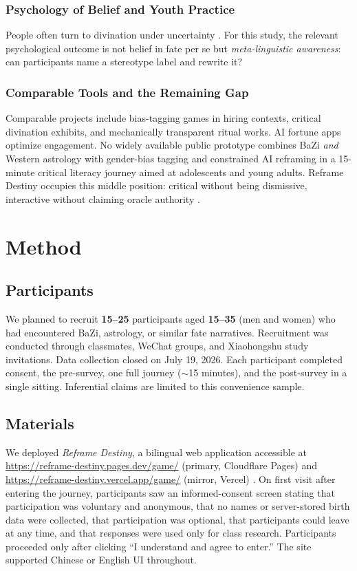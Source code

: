 \documentclass[stu,12pt,floatsintext]{apa7}
\begin{document}
\subsubsection{Psychology of Belief and Youth Practice}

People often turn to divination under uncertainty \parencite{vyse2018}. For this study, the relevant psychological outcome is not belief in fate per se but \emph{meta-linguistic awareness}: can participants name a stereotype label and rewrite it?

\subsubsection{Comparable Tools and the Remaining Gap}

Comparable projects include bias-tagging games in hiring contexts, critical divination exhibits, and mechanically transparent ritual works. AI fortune apps optimize engagement. No widely available public prototype combines BaZi \emph{and} Western astrology with gender-bias tagging and constrained AI reframing in a 15-minute critical literacy journey aimed at adolescents and young adults. Reframe Destiny occupies this middle position: critical without being dismissive, interactive without claiming oracle authority \parencite{bender2021}.

\section{Method}

\subsection{Participants}

We planned to recruit \textbf{15--25} participants aged \textbf{15--35} (men and women) who had encountered BaZi, astrology, or similar fate narratives. Recruitment was conducted through classmates, WeChat groups, and Xiaohongshu study invitations. Data collection closed on July 19, 2026. Each participant completed consent, the pre-survey, one full journey ($\sim$15 minutes), and the post-survey in a single sitting. Inferential claims are limited to this convenience sample.

\subsection{Materials}

We deployed \textit{Reframe Destiny}, a bilingual web application accessible at \url{https://reframe-destiny.pages.dev/game/} (primary, Cloudflare Pages) and \url{https://reframe-destiny.vercel.app/game/} (mirror, Vercel) \parencite{reframeDestiny2026}. On first visit after entering the journey, participants saw an informed-consent screen stating that participation was voluntary and anonymous, that no names or server-stored birth data were collected, that participation was optional, that participants could leave at any time, and that responses were used only for class research. Participants proceeded only after clicking ``I understand and agree to enter.'' The site supported Chinese or English UI throughout.
\end{document}
